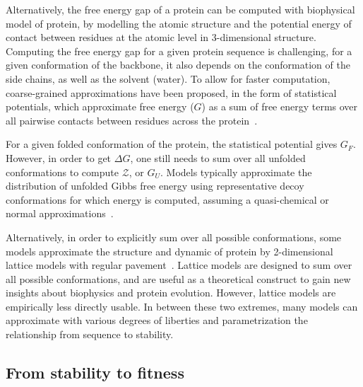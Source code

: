 Alternatively, the free energy gap of a protein can be computed with biophysical model of protein, by modelling the atomic structure and the potential energy of contact between residues at the atomic level in 3-dimensional structure.
Computing the free energy gap for a given protein sequence is challenging, for a given conformation of the backbone, it also depends on the conformation of the side chains, as well as the solvent (water).
To allow for faster computation, coarse-grained approximations have been proposed, in the form of statistical potentials, which approximate free energy ($G$) as a sum of free energy terms over all pairwise contacts between residues across the protein~\citep{Miyazawa1985}.

For a given folded conformation of the protein, the statistical potential gives $G_F$.
However, in order to get $\Delta G$, one still needs to sum over all unfolded conformations to compute $\mathcal{Z}$, or $G_U$.
Models typically approximate the distribution of unfolded Gibbs free energy using representative decoy conformations for which energy is computed, assuming a quasi-chemical or normal approximations~\citep{Goldstein2011}.

Alternatively, in order to explicitly sum over all possible conformations, some models approximate the structure and dynamic of protein by 2-dimensional lattice models with regular pavement~\citep{Taverna2002, Noivirt-Brik2009}.
Lattice models are designed to sum over all possible conformations, and are useful as a theoretical construct to gain new insights about biophysics and protein evolution.
However, lattice models are empirically less directly usable.
In between these two extremes, many models can approximate with various degrees of liberties and parametrization the relationship from sequence to stability.


\subsection{From stability to fitness}

